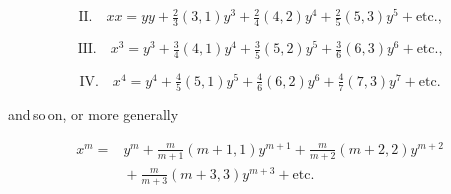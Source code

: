 \[\text{II.}\quad xx = yy+\tfrac23(3,1)y^3+\tfrac24(4,2)y^4+\tfrac25(5,3)y^5+\text{etc.,}\]

\[\text{III.}\quad x^3 = y^3+\tfrac34(4,1)y^4+\tfrac35(5,2)y^5+\tfrac36(6,3)y^6+\text{etc.,}\]

\[\text{IV.}\quad x^4 = y^4+\tfrac45(5,1)y^5+\tfrac46(6,2)y^6+\tfrac47(7,3)y^7+\text{etc.}\]

\noindent and\,so\,on, or more generally

\[
\begin{aligned}x^m ={}&y^m + \frac{m}{m+1}(m+1,1)y^{m+1}+\frac{m}{m+2}(m+2,2)y^{m+2}\\ &{}+\frac{m}{m+3}(m+3,3)y^{m+3}+\text{etc.}
\end{aligned}
\]

